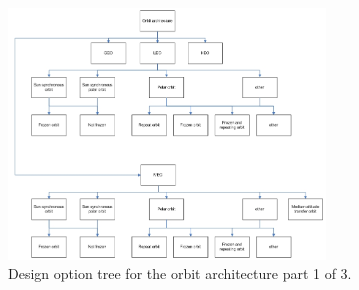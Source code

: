 \begin{figure}
\centering
  \includegraphics[width=0.75\textwidth,angle=0]{chapters/img/blDOOrb1.jpg}
	\caption{Design option tree for the orbit architecture part 1 of 3.}
	\label{DOOrb1}
\end{figure}

